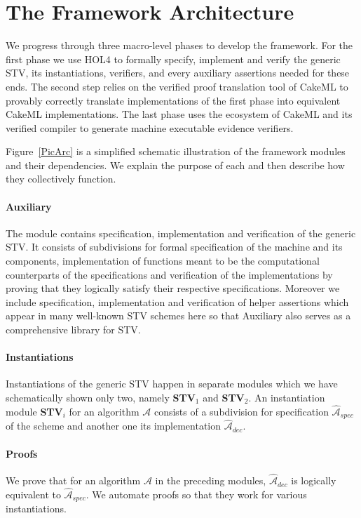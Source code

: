 \documentclass[10pt,conference]{IEEEtran}
\begin{document}
\section{The Framework Architecture}\label{sec:Arc} 
We progress through three macro-level phases to develop the framework. For the first phase we use HOL4 to formally specify, implement and verify the generic STV, its instantiations, verifiers, and every auxiliary assertions needed for these ends. The second step relies on the verified proof translation tool of CakeML to provably correctly translate implementations of the first phase into equivalent CakeML implementations. The last phase uses the ecosystem of CakeML and its verified compiler to generate machine executable evidence verifiers.   


Figure~\ref{PicArc} is a simplified schematic illustration of the framework modules and their dependencies. We explain the purpose of each and then describe how they collectively function.

\paragraph*{\textbf{Auxiliary}} The module contains specification, implementation and verification of the generic STV. It consists of subdivisions for formal specification of the machine and its components, implementation of functions  meant to be the computational counterparts of the specifications and verification of the implementations by proving that they logically satisfy their respective specifications. Moreover we include specification, implementation and verification of helper assertions which appear in many well-known STV schemes here so that Auxiliary also serves as a comprehensive library for STV. 
\paragraph*{\textbf{Instantiations}}
  Instantiations of the generic STV happen in separate modules which we have schematically shown only two, namely   \textbf{STV}$_{1}$ and \textbf{STV}$_{2}$. An instantiation module \textbf{STV}$_{i}$ for an algorithm $\mathcal{A}$ consists of a subdivision for specification $\hat{\mathcal{A}}_{spec}$ of  the scheme and another one its implementation $\hat{\mathcal{A}}_{dec}$. 
\paragraph*{\textbf{Proofs}} We prove that for an algorithm $\mathcal{A}$ in the preceding modules,  $\hat{\mathcal{A}}_{dec}$ is logically equivalent to $\hat{\mathcal{A}}_{spec}$. We automate proofs so that they work for various instantiations. 
\end{document}
